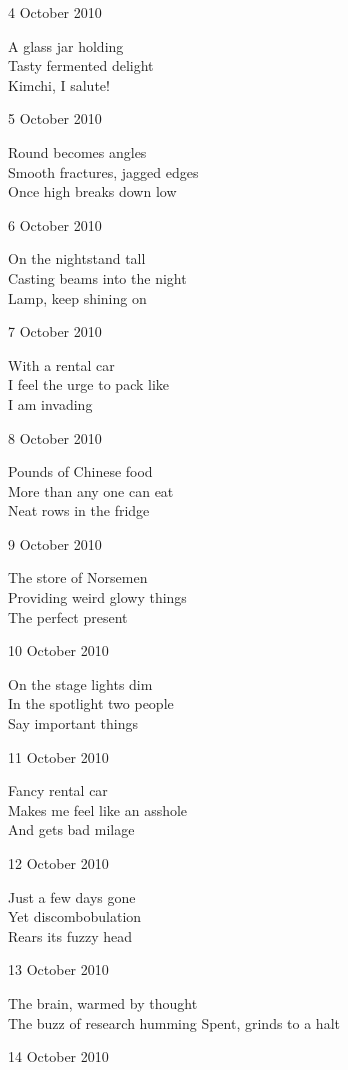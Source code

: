 \documentclass[12pt]{article}
\begin{document}
\newpage

4 October 2010

A glass jar holding \\
Tasty fermented delight \\
Kimchi, I salute!

5 October 2010

Round becomes angles \\
Smooth fractures, jagged edges \\
Once high breaks down low

6 October 2010

On the nightstand tall \\
Casting beams into the night \\
Lamp, keep shining on

7 October 2010

With a rental car \\
I feel the urge to pack like \\
I am invading

8 October 2010

Pounds of Chinese food \\
More than any one can eat \\
Neat rows in the fridge

9 October 2010

The store of Norsemen \\
Providing weird glowy things \\
The perfect present

10 October 2010

On the stage lights dim \\
In the spotlight two people \\
Say important things


\newpage

11 October 2010

Fancy rental car \\
Makes me feel like an asshole \\
And gets bad milage

12 October 2010

Just a few days gone \\
Yet discombobulation \\
Rears its fuzzy head

13 October 2010

The brain, warmed by thought \\
The buzz of research humming
Spent, grinds to a halt 

14 October 2010
\end{document}
